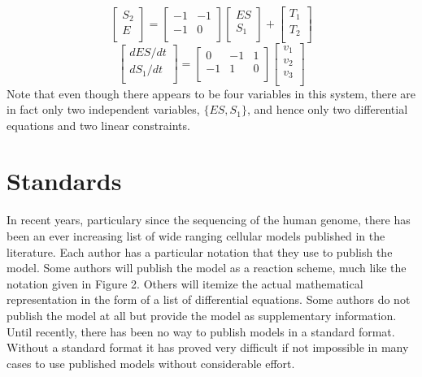 \documentclass[12pt]{article}
\begin{document}
\begin{boxedminipage}[hbp]{14cm}
$$
\left[ \begin{array}{l}
  S_2 \\
  E \\
\end{array} \right] =
\left[ \begin{array}{rr}
  -1 & -1 \\
  -1 & 0 \\
\end{array}  \right]
\left[
\begin{array}{l}
    ES \\
    S_1 \\
\end{array}
\right] +
\left[
\begin{array}{l}
  T_1 \\
  T_2 \\
\end{array}
\right]$$
$$\left[
\begin{array}{l}
  dES/dt \\
  dS_1/dt \\
\end{array}
\right] =
\left[
\begin{array}{rrr}
  0 & -1 & 1 \\
  -1 & 1 & 0 \\
\end{array}
\right]
\left[
\begin{array}{l}
  v_1 \\
  v_2 \\
  v_3 \\
\end{array}
\right]$$ Note that even though there appears to be four variables
in this system, there are in fact only two independent variables, $\{ES, S_1\}$,
and hence only two differential equations and two linear constraints.

\end{boxedminipage}

\section{Standards}

In recent years, particulary since the sequencing of the human
genome, there has been an ever increasing list of wide ranging
cellular models published in the literature. Each author has a
particular notation that they use to publish the model. Some authors
will publish the model as a reaction scheme, much like the
notation given in Figure 2. Others will itemize the actual
mathematical representation in the form of a list of differential
equations. Some authors do not publish the model at all but
provide the model as supplementary information. Until recently,
there has been no way to publish models in a standard format.
Without a standard format it has proved very difficult if not
impossible in many cases to use published models without
considerable effort.
\end{document}

